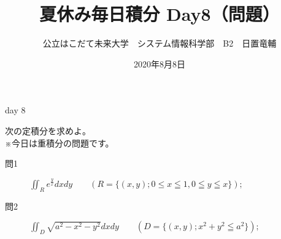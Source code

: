 \documentclass[dvipdfmx,uplatex]{jsarticle}
\title{夏休み毎日積分 Day8（問題）}
\author{公立はこだて未来大学　システム情報科学部　B2　日置竜輔}
\date{2020年8月8日}
\begin{document}
\maketitle

\begin{itembox}[c]{day 8 }
    \begin{center}
        次の定積分を求めよ。\\
        ※今日は重積分の問題です。
    \end{center}
\end{itembox}

\begin{description}
    \item [問1] $\displaystyle \iint_R e^{\frac{y}{x}} dxdy \qquad (R = \{(x,y); 0 \leq x \leqq 1, 0 \leqq y \leqq x\});$
\end{description}

\begin{description}
    \item [問2] $\displaystyle \iint_D \sqrt{a^2 - x^2 - y^2} dxdy \qquad (D = \{(x,y); x^2 + y^2 \leqq a^2\});$
\end{description}
\end{document}
